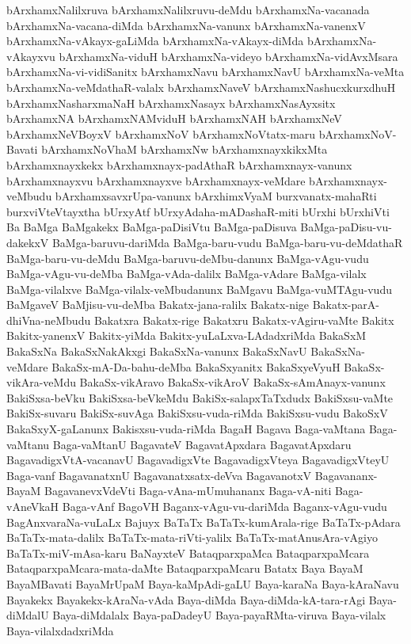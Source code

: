 {bArxhamxNalilxruva
bArxhamxNalilxruvu-deMdu
bArxhamxNa-vacanada
bArxhamxNa-vacana-diMda
bArxhamxNa-vanunx
bArxhamxNa-vanenxV
bArxhamxNa-vAkayx-gaLiMda
bArxhamxNa-vAkayx-diMda
bArxhamxNa-vAkayxvu
bArxhamxNa-viduH
bArxhamxNa-videyo
bArxhamxNa-vidAvxMsara
bArxhamxNa-vi-vidiSanitx
bArxhamxNavu
bArxhamxNavU
bArxhamxNa-veMta
bArxhamxNa-veMdathaR-valalx
bArxhamxNaveV
bArxhamxNashucxkurxdhuH
bArxhamxNasharxmaNaH
bArxhamxNasayx
bArxhamxNasAyxsitx
bArxhamxNA
bArxhamxNAMviduH
bArxhamxNAH
bArxhamxNeV
bArxhamxNeVBoyxV
bArxhamxNoV
bArxhamxNoVtatx-maru
bArxhamxNoV-Bavati
bArxhamxNoVhaM
bArxhamxNw
bArxhamxnayxkikxMta
bArxhamxnayxkekx
bArxhamxnayx-padAthaR
bArxhamxnayx-vanunx
bArxhamxnayxvu
bArxhamxnayxve
bArxhamxnayx-veMdare
bArxhamxnayx-veMbudu
bArxhamxsavxrUpa-vanunx
bArxhimxVyaM
burxvanatx-mahaRti
burxviVteVtayxtha
bUrxyAtf
bUrxyAdaha-mADashaR-miti
bUrxhi
bUrxhiVti
Ba
BaMga
BaMgakekx
BaMga-paDisiVtu
BaMga-paDisuva
BaMga-paDisu-vu-dakekxV
BaMga-baruvu-dariMda
BaMga-baru-vudu
BaMga-baru-vu-deMdathaR
BaMga-baru-vu-deMdu
BaMga-baruvu-deMbu-danunx
BaMga-vAgu-vudu
BaMga-vAgu-vu-deMba
BaMga-vAda-dalilx
BaMga-vAdare
BaMga-vilalx
BaMga-vilalxve
BaMga-vilalx-veMbudanunx
BaMgavu
BaMga-vuMTAgu-vudu
BaMgaveV
BaMjisu-vu-deMba
Bakatx-jana-ralilx
Bakatx-nige
Bakatx-parA-dhiVna-neMbudu
Bakatxra
Bakatx-rige
Bakatxru
Bakatx-vAgiru-vaMte
Bakitx
Bakitx-yanenxV
Bakitx-yiMda
Bakitx-yuLaLxva-LAdadxriMda
BakaSxM
BakaSxNa
BakaSxNakAkxgi
BakaSxNa-vanunx
BakaSxNavU
BakaSxNa-veMdare
BakaSx-mA-Da-bahu-deMba
BakaSxyanitx
BakaSxyeVyuH
BakaSx-vikAra-veMdu
BakaSx-vikAravo
BakaSx-vikAroV
BakaSx-sAmAnayx-vanunx
BakiSxsa-beVku
BakiSxsa-beVkeMdu
BakiSx-salapxTaTxdudx
BakiSxsu-vaMte
BakiSx-suvaru
BakiSx-suvAga
BakiSxsu-vuda-riMda
BakiSxsu-vudu
BakoSxV
BakaSxyX-gaLanunx
Bakisxsu-vuda-riMda
BagaH
Bagava
Baga-vaMtana
Baga-vaMtanu
Baga-vaMtanU
BagavateV
BagavatApxdara
BagavatApxdaru
BagavadigxVtA-vacanavU
BagavadigxVte
BagavadigxVteya
BagavadigxVteyU
Baga-vanf
BagavanatxnU
Bagavanatxsatx-deVva
BagavanotxV
Bagavananx-BayaM
BagavanevxVdeVti
Baga-vAna-mUmuhananx
Baga-vA-niti
Baga-vAneVkaH
Baga-vAnf
BagoVH
Baganx-vAgu-vu-dariMda
Baganx-vAgu-vudu
BagAnxvaraNa-vuLaLx
Bajuyx
BaTaTx
BaTaTx-kumArala-rige
BaTaTx-pAdara
BaTaTx-mata-dalilx
BaTaTx-mata-riVti-yalilx
BaTaTx-matAnusAra-vAgiyo
BaTaTx-miV-mAsa-karu
BaNayxteV
BataqparxpaMca
BataqparxpaMcara
BataqparxpaMcara-mata-daMte
BataqparxpaMcaru
Batatx
Baya
BayaM
BayaMBavati
BayaMrUpaM
Baya-kaMpAdi-gaLU
Baya-karaNa
Baya-kAraNavu
Bayakekx
Bayakekx-kAraNa-vAda
Baya-diMda
Baya-diMda-kA-tara-rAgi
Baya-diMdalU
Baya-diMdalalx
Baya-paDadeyU
Baya-payaRMta-viruva
Baya-vilalx
Baya-vilalxdadxriMda
}
